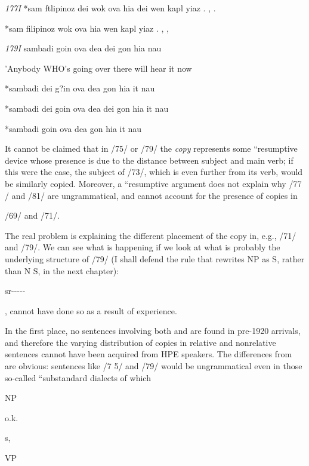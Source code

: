 \textit{177I }*sam ftlipinoz dei wok ova hia dei wen kapl yiaz . , .

\ea\label{ex:78}
 *sam filipinoz wok ova hia wen kapl yiaz . , ,
\glt
\z

\textit{17}\textit{9}\textit{I }sambadi goin ova dea dei gon hia nau

'Anybody WHO's going over there will hear it now

\ea\label{ex:80}
 *sambadi dei g?in ova dea gon hia it nau
\glt
\z

\ea\label{ex:81}
 *sambadi dei goin ova dea dei gon hia it nau
\glt
\z

\ea\label{ex:82}
 *sambadi goin ova dea gon hia it nau
\glt
\z

It cannot be claimed that in /75/ or /79/ the \textit{c}\textit{o}\textit{py }represents some ``resumptive device whose presence is due to the distance be\-tween subject and main verb; if this were the case, the subject of /73/, which is even further from its verb, would be similarly copied. More\-over, a ``resumptive argument does not explain why /77 / and /81/ are ungrammatical, and cannot account for the presence of copies in

/69/ and /71/.


The real problem is explaining the different placement of the copy in, e.g., /71/ and /79/. We can see what is happening if we look at what is probably the underlying structure of /79/ (I shall defend the rule that rewrites NP as S, rather than N S, in the next chapter):

\ea\label{ex:83}
 sr-{}-{}-{}-{}-
\glt
\z


, cannot have done so as a result of experience.

In the first place, no sentences involving both  and  are found in pre-1920 arrivals, and therefore the varying distribution of copies in relative and nonrelative sentences cannot have been acquired from HPE speakers. The differences from  are obvious: sentences like /7 5/ and /79/ would be ungramma\-tical even in those so-called ``substandard dialects of  which

NP

o.k.

s,

VP


